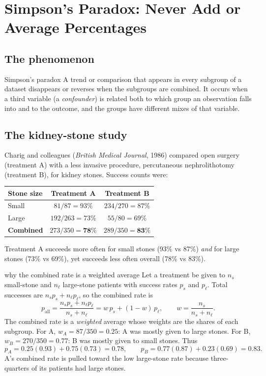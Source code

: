 \documentclass[11pt]{article}
\begin{document}
\section{Simpson's Paradox: Never Add or Average Percentages}
\subsection{The phenomenon}
\begin{definition}{Simpson's paradox}
A trend or comparison that appears in every subgroup of a dataset disappears or reverses when the subgroups are combined. It occurs when a third variable (a \emph{confounder}) is related both to which group an observation falls into and to the outcome, and the groups have different mixes of that variable.
\end{definition}

\subsection{The kidney-stone study}
Charig and colleagues (\textit{British Medical Journal}, 1986) compared open surgery (treatment A) with a less invasive procedure, percutaneous nephrolithotomy (treatment B), for kidney stones. Success counts were:

\begin{center}\renewcommand{\arraystretch}{1.3}
\begin{tabular}{lcc}\toprule Stone size & Treatment A & Treatment B\\\midrule
Small & $81/87=93\%$ & $234/270=87\%$\\
Large & $192/263=73\%$ & $55/80=69\%$\\\midrule
\textbf{Combined} & $273/350=\mathbf{78\%}$ & $289/350=\mathbf{83\%}$\\\bottomrule\end{tabular}\end{center}

Treatment A succeeds more often for small stones (93\% vs 87\%) \emph{and} for large stones (73\% vs 69\%), yet succeeds less often overall (78\% vs 83\%).

\begin{derivation}{why the combined rate is a weighted average}
Let a treatment be given to $n_s$ small-stone and $n_\ell$ large-stone patients with success rates $p_s$ and $p_\ell$. Total successes are $n_sp_s+n_\ell p_\ell$, so the combined rate is
\[p_{\text{all}}=\frac{n_sp_s+n_\ell p_\ell}{n_s+n_\ell}=w\,p_s+(1-w)\,p_\ell,\qquad w=\frac{n_s}{n_s+n_\ell}.\]
The combined rate is a \emph{weighted} average whose weights are the shares of each subgroup. For A, $w_A=87/350=0.25$: A was mostly given to large stones. For B, $w_B=270/350=0.77$: B was mostly given to small stones. Thus
\[p_A=0.25(0.93)+0.75(0.73)=0.78,\qquad p_B=0.77(0.87)+0.23(0.69)=0.83.\]
A's combined rate is pulled toward the low large-stone rate because three-quarters of its patients had large stones.
\end{derivation}
\end{document}
